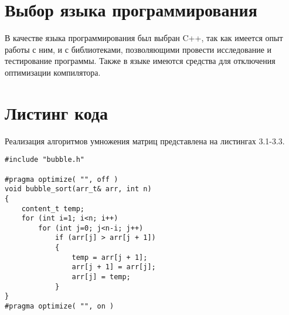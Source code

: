 \section{Выбор языка программирования}
В качестве языка программирования был выбран C++, так как имеется опыт работы с ним, и с библиотеками, позволяющими провести исследование и тестирование программы. Также в языке имеются средства для отключения оптимизации компилятора.


\section{Листинг кода}
Реализация алгоритмов умножения матриц представлена на листингах 3.1-3.3.

\begin{lstlisting}[caption = Функция сортировки пузырьком.]
#include "bubble.h"

#pragma optimize( "", off )
void bubble_sort(arr_t& arr, int n)
{
	content_t temp;
	for (int i=1; i<n; i++)
		for (int j=0; j<n-i; j++)
			if (arr[j] > arr[j + 1])
			{
				temp = arr[j + 1];
				arr[j + 1] = arr[j];
				arr[j] = temp;
			}
}
#pragma optimize( "", on )
\end{lstlisting}

